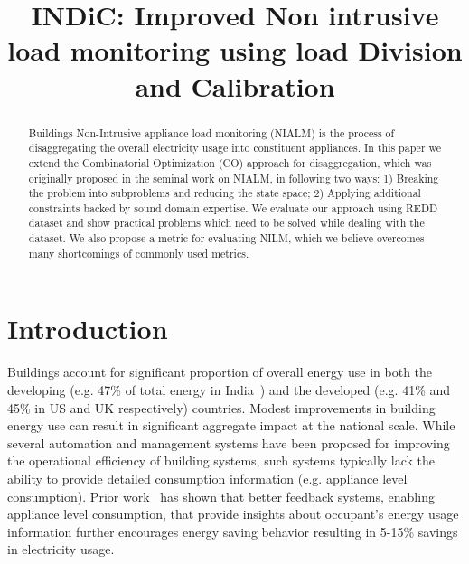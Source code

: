 \documentclass[conference]{IEEEtran}
\begin{document}
%
\title{INDiC: Improved Non intrusive load monitoring using load Division and Calibration}


\author{
\and
{}
\and
{}
}
\maketitle


\begin{abstract}
Buildings Non-Intrusive appliance load monitoring (NIALM) is the process of disaggregating the overall electricity usage into constituent appliances. In this paper we extend the Combinatorial Optimization (CO) approach for disaggregation, which was originally proposed in the seminal work on NIALM, in following two ways: 1) Breaking the problem into subproblems and reducing the state space; 2) Applying additional constraints backed by sound domain expertise. We evaluate our approach using REDD dataset and show practical problems which need to be solved while dealing with the dataset. We also propose a metric for evaluating NILM, which we believe overcomes many shortcomings of commonly used metrics.
\end{abstract}
\IEEEpeerreviewmaketitle



\section{Introduction}
\noindent Buildings account for significant proportion of overall energy use in both the developing (e.g. 47\% of total energy in India~\cite{evans09}) and the developed (e.g. 41\% and 45\% in US and UK respectively) countries. Modest improvements in building energy use can result in significant aggregate impact at the national scale. While several automation and management systems have been proposed for improving the operational efficiency of building systems, such systems typically lack the ability to provide detailed consumption information (e.g. appliance level consumption). Prior work~\cite{darby} has shown that better feedback systems, enabling appliance level consumption, that provide insights about occupant's energy usage information further encourages energy saving behavior resulting in 5-15\% savings in electricity usage.
\end{document}
